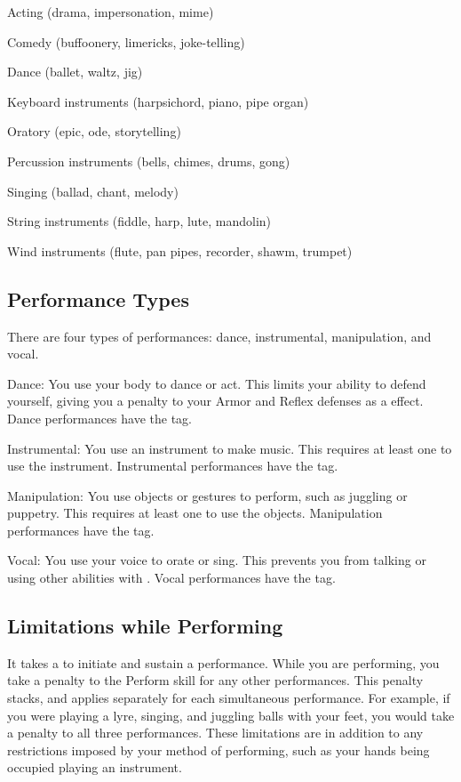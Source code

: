   \begin{raggeditemize}
    \item Acting (drama, impersonation, mime)
    \item Comedy (buffoonery, limericks, joke-telling)
    \item Dance (ballet, waltz, jig)
    \item Keyboard instruments (harpsichord, piano, pipe organ)
    \item Oratory (epic, ode, storytelling)
    \item Percussion instruments (bells, chimes, drums, gong)
    \item Singing (ballad, chant, melody)
    \item String instruments (fiddle, harp, lute, mandolin)
    \item Wind instruments (flute, pan pipes, recorder, shawm, trumpet)
  \end{raggeditemize}

  \subsection{Performance Types}\label{Performance Types}
    There are four types of performances: dance, instrumental, manipulation, and vocal.
    \begin{raggeditemize}
      \item Dance: You use your body to dance or act. This limits your ability to defend yourself, giving you a  penalty to your Armor and Reflex defenses as a \atSwift effect. Dance performances have the \atVisual tag.
      \item Instrumental: You use an instrument to make music. This requires at least one  to use the instrument. Instrumental performances have the \atAuditory tag.
      \item Manipulation: You use objects or gestures to perform, such as juggling or puppetry. This requires at least one  to use the objects. Manipulation performances have the \atVisual tag.
      \item Vocal: You use your voice to orate or sing. This prevents you from talking or using other abilities with . Vocal performances have the \atAuditory tag.
    \end{raggeditemize}

  \subsection{Limitations while Performing}
    It takes a  to initiate and sustain a performance.
    While you are performing, you take a  penalty to the Perform skill for any other performances.
    This penalty stacks, and applies separately for each simultaneous performance.
    For example, if you were playing a lyre, singing, and juggling balls with your feet, you would take a  penalty to all three performances.
    These limitations are in addition to any restrictions imposed by your method of performing, such as your hands being occupied playing an instrument.

